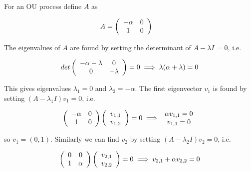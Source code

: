 \documentclass{article}
\numberwithin{questioncounter}{section}
\begin{document}
\begin{solution}
For an OU process define $A$ as

\begin{align*}
A &= \left( \begin{array}{c c} -\alpha & 0 \\ 1 & 0 \end{array} \right)
\end{align*}

The eigenvalues of $A$ are found by setting the determinant of $A - \lambda I$ = 0, i.e.

\begin{align*}
det\left( \begin{array}{c c} -\alpha - \lambda & 0 \\ 0 & -\lambda \end{array} \right) = 0 \implies \lambda (\alpha + \lambda) = 0
\end{align*}

This gives eigenvalues $\lambda_{1} = 0$ and $\lambda_{2} = -\alpha$. The first eigenvector $v_{1}$ is found by setting $(A - \lambda_{1} I) v_{1} = 0$, i.e.

\begin{align*}
\left( \begin{array}{c c} -\alpha & 0 \\ 1 & 0 \end{array} \right) \left(\begin{array}{c} v_{1,1} \\ v_{1,2} \end{array} \right) = 0 \implies \begin{array}{c} \alpha v_{1,1} = 0 \\ v_{1,1} = 0 \end{array}
\end{align*}

so $v_{1} = (0, 1)$. Similarly we can find $v_{2}$ by setting $(A - \lambda_{2} I) v_{2} = 0$, i.e.

\begin{align*}
\left(\begin{array}{c c} 0 & 0 \\ 1 & \alpha \end{array} \right) \left( \begin{array}{c} v_{2,1} \\ v_{2,2} \end{array} \right) = 0 \implies v_{2,1} + \alpha v_{2,2} = 0
\end{align*}


\end{solution}
\end{document}
